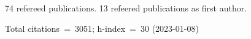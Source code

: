 74 refereed publications. 13 refeered publications as first author.

Total citations~=~3051; h-index~=~30 (2023-01-08)